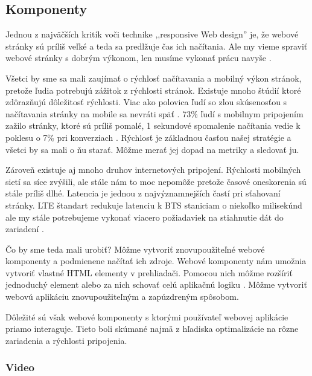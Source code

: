 

\subsection{Komponenty} %
\label{sub:komponenty}

Jednou z najväčších kritík voči technike ,,responsive Web design'' je, že webové stránky sú príliš veľké a teda sa predlžuje čas ich načítania. Ale my vieme spraviť webové stránky s dobrým výkonom, len musíme vykonať prácu navyše \cite{20mb}.

Všetci by sme sa mali zaujímať o rýchlosť načítavania a mobilný výkon stránok, pretože ľudia potrebujú zážitok z rýchlosti stránok. Existuje mnoho štúdií ktoré zdôrazňujú dôležitosť rýchlosti. Viac ako polovica ľudí so zlou skúsenosťou s načítavania stránky na mobile sa nevráti späť \cite{OptimizingtheCriticalRenderingPath}. 73\% ľudí s mobilnym pripojením zažilo stránky, ktoré sú príliš pomalé, 1 sekundové spomalenie načítania vedie k poklesu o 7\% pri konverziach \cite{pagespeed}. Rýchlosť je základnou časťou našej stratégie a všetci by sa mali o ňu starať. Môžme merať jej dopad na metriky a sledovať ju.

Zároveň existuje aj mnoho druhov internetových pripojení. Rýchlosti mobilných sietí sa síce zvýšili, ale stále nám to moc nepomôže pretože časové oneskorenia sú stále príliš dlhé. Latencia je jednou z najvýznamnejších častí pri sťahovaní stránky. LTE štandart redukuje latenciu k BTS staniciam o niekoľko milisekúnd ale my stále potrebujeme vykonať viacero požiadaviek na stiahnutie dát do zariadení \cite{OptimizingtheCriticalRenderingPath}.

Čo by sme teda mali urobiť? Môžme vytvoriť znovupoužiteľné webové komponenty a podmienene načítať ich zdroje. Webové komponenty nám umožnia vytvoriť vlastné HTML elementy v prehliadači. Pomocou nich môžme rozšíriť jednoduchý element alebo za nich schovať celú aplikačnú logiku \cite{webcomponents}. Môžme vytvoriť webovú aplikáciu znovupoužiteľným a zapúzdreným spôsobom.

Dôležité sú však webové komponenty s ktorými používateľ webovej aplikácie priamo interaguje. Tieto boli skúmané najmä z hľadiska optimalizácie na rôzne zariadenia a rýchlosti pripojenia.

\subsubsection{Video} %
\label{subsub:video}

